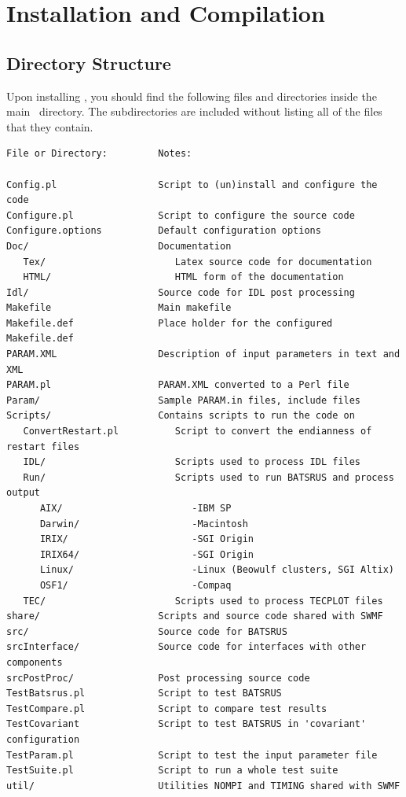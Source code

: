 \section{Installation and Compilation \label{section:install_compile}}

\subsection{Directory Structure \label{section:directory}}

Upon installing \BATSRUS, you should find the following files
and directories inside the main \BATSRUS\ directory.  
The subdirectories are included without listing
all of the files that they contain.
\begin{verbatim}
File or Directory:         Notes:

Config.pl                  Script to (un)install and configure the code
Configure.pl               Script to configure the source code
Configure.options          Default configuration options
Doc/                       Documentation 
   Tex/                       Latex source code for documentation
   HTML/                      HTML form of the documentation
Idl/                       Source code for IDL post processing
Makefile                   Main makefile
Makefile.def               Place holder for the configured Makefile.def
PARAM.XML                  Description of input parameters in text and XML
PARAM.pl                   PARAM.XML converted to a Perl file
Param/                     Sample PARAM.in files, include files
Scripts/                   Contains scripts to run the code on
   ConvertRestart.pl          Script to convert the endianness of restart files
   IDL/                       Scripts used to process IDL files
   Run/                       Scripts used to run BATSRUS and process output
      AIX/                       -IBM SP
      Darwin/                    -Macintosh
      IRIX/                      -SGI Origin
      IRIX64/                    -SGI Origin
      Linux/                     -Linux (Beowulf clusters, SGI Altix)
      OSF1/                      -Compaq
   TEC/                       Scripts used to process TECPLOT files
share/                     Scripts and source code shared with SWMF
src/                       Source code for BATSRUS
srcInterface/              Source code for interfaces with other components
srcPostProc/               Post processing source code
TestBatsrus.pl             Script to test BATSRUS
TestCompare.pl             Script to compare test results
TestCovariant              Script to test BATSRUS in 'covariant' configuration
TestParam.pl               Script to test the input parameter file
TestSuite.pl               Script to run a whole test suite
util/                      Utilities NOMPI and TIMING shared with SWMF
\end{verbatim}

